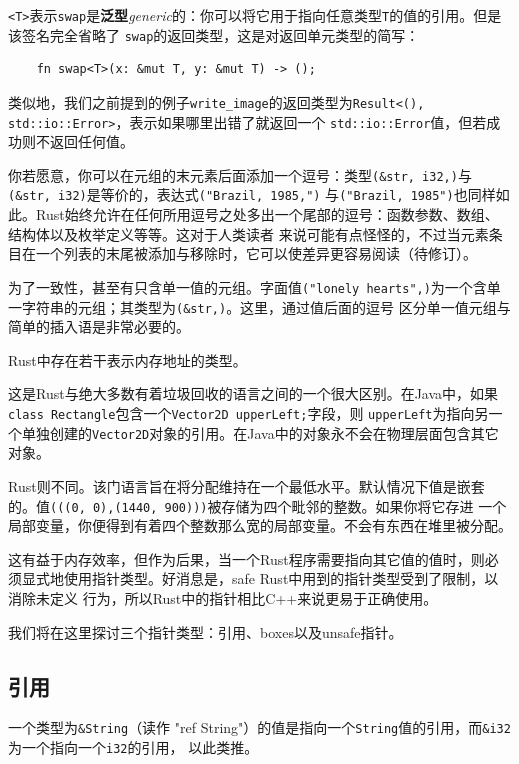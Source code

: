 \smallskip
\texttt{<T>}表示\texttt{swap}是\textbf{泛型}\textit{generic}的：你可以将它用于指向任意类型\texttt{T}的值的引用。但是该签名完全省略了
\texttt{swap}的返回类型，这是对返回单元类型的简写：
\begin{verbatim}
    fn swap<T>(x: &mut T, y: &mut T) -> ();
\end{verbatim}
 
\smallskip
类似地，我们之前提到的例子\texttt{write\_image}的返回类型为\texttt{Result<(), std::io::Error>}，表示如果哪里出错了就返回一个
\texttt{std::io::Error}值，但若成功则不返回任何值。

\medskip
你若愿意，你可以在元组的末元素后面添加一个逗号：类型\texttt{(\&str, i32,)}与\texttt{(\&str, i32)}是等价的，表达式\texttt{("Brazil, 1985,")}
与\texttt{("Brazil, 1985")}也同样如此。Rust始终允许在任何所用逗号之处多出一个尾部的逗号：函数参数、数组、结构体以及枚举定义等等。这对于人类读者
来说可能有点怪怪的，不过当元素条目在一个列表的末尾被添加与移除时，它可以使差异更容易阅读（待修订）。

\medskip
为了一致性，甚至有只含单一值的元组。字面值\texttt{("lonely hearts",)}为一个含单一字符串的元组；其类型为\texttt{(\&str,)}。这里，通过值后面的逗号
区分单一值元组与简单的插入语是非常必要的。

\bigskip
{}
Rust中存在若干表示内存地址的类型。

\medskip
这是Rust与绝大多数有着垃圾回收的语言之间的一个很大区别。在Java中，如果\texttt{class Rectangle}包含一个\texttt{Vector2D upperLeft;}字段，则
\texttt{upperLeft}为指向另一个单独创建的\texttt{Vector2D}对象的引用。在Java中的对象永不会在物理层面包含其它对象。

\medskip
Rust则不同。该门语言旨在将分配维持在一个最低水平。默认情况下值是嵌套的。值\texttt{(((0, 0),(1440, 900)))}被存储为四个毗邻的整数。如果你将它存进
一个局部变量，你便得到有着四个整数那么宽的局部变量。不会有东西在堆里被分配。

\medskip
这有益于内存效率，但作为后果，当一个Rust程序需要指向其它值的值时，则必须显式地使用指针类型。好消息是，safe Rust中用到的指针类型受到了限制，以消除未定义
行为，所以Rust中的指针相比C++来说更易于正确使用。

\medskip
我们将在这里探讨三个指针类型：引用、boxes以及unsafe指针。

\medskip
\subsection{引用}
一个类型为\texttt{\&String}（读作 "ref String"）的值是指向一个\texttt{String}值的引用，而\texttt{\&i32}为一个指向一个\texttt{i32}的引用，
以此类推。

